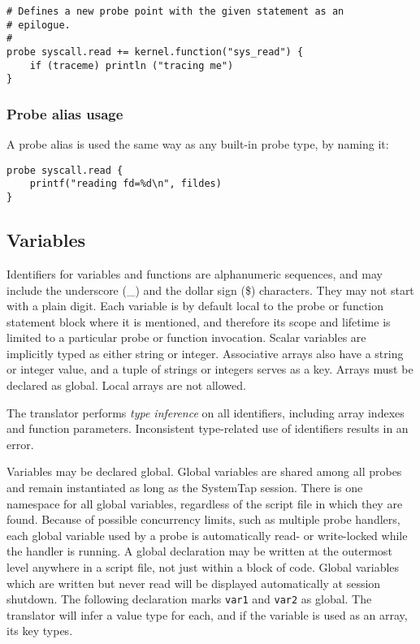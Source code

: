 \documentclass[twoside,english]{article}
\newenvironment{vindent}
{\begin{list}{}{\setlength{\listparindent}{6pt}}
\item[]}
{\end{list}}
\begin{document}
\begin{vindent}
\begin{verbatim}
# Defines a new probe point with the given statement as an
# epilogue.
#
probe syscall.read += kernel.function("sys_read") {
    if (traceme) println ("tracing me")
}
\end{verbatim}
\end{vindent}

\subsubsection{Probe alias usage}

A probe alias is used the same way as any built-in probe type, by
naming it:

\begin{vindent}
\begin{verbatim}
probe syscall.read {
    printf("reading fd=%d\n", fildes)
}
\end{verbatim}
\end{vindent}

\subsection{Variables\label{sub:Variables}}
Identifiers for variables and functions are alphanumeric sequences, and may
include the underscore (\_) and the dollar sign (\$) characters. They may
not start with a plain digit. Each variable is by default local to the probe
or function statement block where it is mentioned, and therefore its scope
and lifetime is limited to a particular probe or function invocation. Scalar
variables are implicitly typed as either string or integer. Associative arrays
also have a string or integer value, and a tuple of strings or integers serves
as a key. Arrays must be declared as global. Local arrays
are not allowed.

The translator performs \emph{type inference} on all identifiers, including
array indexes and function parameters. Inconsistent type-related use of identifiers
results in an error.

Variables may be declared global. Global variables are shared among all probes
and remain instantiated as long as the SystemTap session. There is one namespace
for all global variables, regardless of the script file in which they are
found. Because of possible concurrency limits, such as multiple probe handlers,
each global variable used by a probe is automatically read- or write-locked
while the handler is running. A global declaration may be written at the
outermost level anywhere in a script file, not just within a block of code.
Global variables which are written but never read will be displayed
automatically at session shutdown.  The following declaration marks
\texttt{var1} and \texttt{var2} as global.
The translator will infer a value type for each, and if the variable is used
as an array, its key types.
\end{document}

